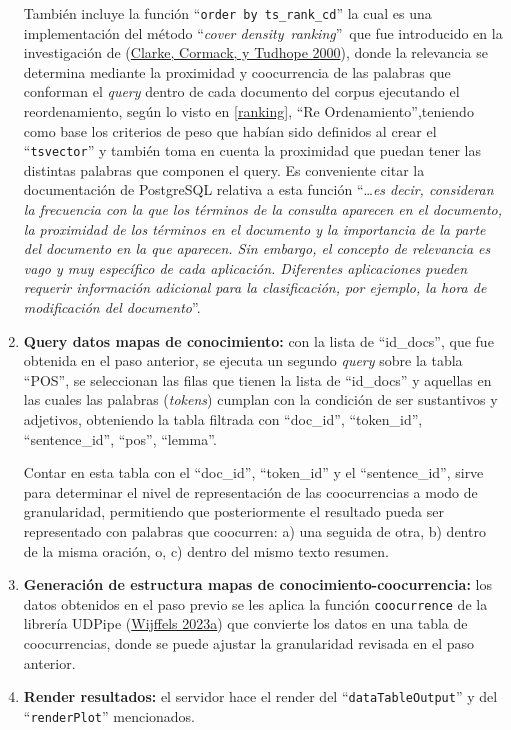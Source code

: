 \documentclass[
  12pt,
  openany]{book}
\begin{document}
\begin{enumerate}
  También incluye la función ``\texttt{order\ by\ ts\_rank\_cd}'' la cual es una implementación del método ``\emph{cover density}~\emph{ranking}''~que fue introducido en la investigación de (\protect\hyperlink{ref-clarke2000}{Clarke, Cormack, y Tudhope 2000}), donde la relevancia se determina mediante la proximidad y coocurrencia de las palabras que conforman el \emph{query} dentro de cada documento del corpus ejecutando el reordenamiento, según lo visto en \ref{ranking}, ``Re Ordenamiento'',teniendo como base los criterios de peso que habían sido definidos al crear el ``\texttt{tsvector}'' y también toma en cuenta la proximidad que puedan tener las distintas palabras que componen el query. Es conveniente citar la documentación de PostgreSQL relativa a esta función ``\ldots{}\emph{es decir, consideran la frecuencia con la que los términos de la consulta aparecen en el documento, la proximidad de los términos en el documento y la importancia de la parte del documento en la que aparecen. Sin embargo, el concepto de relevancia es vago y muy específico de cada aplicación. Diferentes aplicaciones pueden requerir información adicional para la clasificación, por ejemplo, la hora de modificación del documento}''.\\
\item
  \textbf{Query datos mapas de conocimiento:} con la lista de ``id\_docs'', que fue obtenida en el paso anterior, se ejecuta un segundo \emph{query} sobre la tabla ``POS'', se seleccionan las filas que tienen la lista de ``id\_docs'' y aquellas en las cuales las palabras (\emph{tokens}) cumplan con la condición de ser sustantivos y adjetivos, obteniendo la tabla filtrada con ``doc\_id'', ``token\_id'', ``sentence\_id'', ``pos'', ``lemma''.

  Contar en esta tabla con el ``doc\_id'', ``token\_id'' y el ``sentence\_id'', sirve para determinar el nivel de representación de las coocurrencias a modo de granularidad, permitiendo que posteriormente el resultado pueda ser representado con palabras que coocurren: a) una seguida de otra, b) dentro de la misma oración, o, c) dentro del mismo texto resumen.
\item
  \textbf{Generación de estructura mapas de conocimiento-coocurrencia:} los datos obtenidos en el paso previo se les aplica la función \texttt{coocurrence} de la librería UDPipe (\protect\hyperlink{ref-udpipe-4}{Wijffels 2023a}) que convierte los datos en una tabla de coocurrencias, donde se puede ajustar la granularidad revisada en el paso anterior.
\item
  \textbf{Render resultados:} el servidor hace el render del ``\texttt{dataTableOutput}'' y del ``\texttt{renderPlot}'' mencionados.
\end{enumerate}
\end{document}
